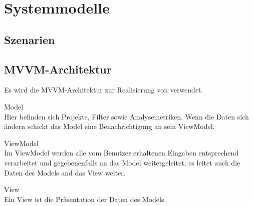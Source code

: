 \chapter{Systemmodelle}
\section{Szenarien}
\section{MVVM-Architektur}
\setcounter{counterKriterien}{0}

Es wird die MVVM-Architektur zur Realisierung von \projektTitel verwendet.

 Model \\
Hier befinden sich Projekte, Filter sowie Analysemetriken. Wenn die Daten
sich ändern schickt das Model eine Benachrichtigung an sein ViewModel.

 ViewModel \\
Im ViewModel werden alle vom Benutzer erhaltenen Eingaben entsprechend verarbeitet und
gegebenenfalls an das Model weitergeleitet, es leitet auch die Daten des Models and das View weiter.

 View \\
Ein View ist die Präsentation der Daten des Models.

